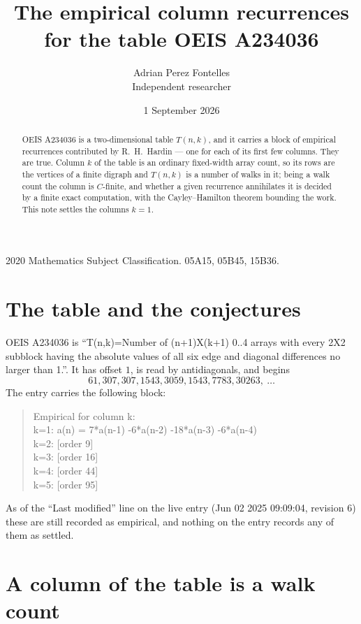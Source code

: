 \documentclass[11pt,a4paper]{article}
\title{The empirical column recurrences for the table OEIS A234036}
\author{Adrian Perez Fontelles\\ \small Independent researcher}
\date{1 September 2026}
\theoremstyle{plain}
\theoremstyle{definition}
\begin{document}
\maketitle

\begin{abstract}
OEIS A234036 is a two-dimensional table $T(n,k)$, and it carries a block of empirical
recurrences contributed by R.~H.~Hardin --- one for each of its first few columns. They are
true. Column $k$ of the table is an ordinary fixed-width array count, so its rows are the
vertices of a finite digraph and $T(n,k)$ is a number of walks in it; being a walk count the
column is $C$-finite, and whether a given recurrence annihilates it is decided by a finite
exact computation, with the Cayley--Hamilton theorem bounding the work. This note settles the
columns $k=1$.
\end{abstract}

\noindent\small 2020 Mathematics Subject Classification. 05A15, 05B45, 15B36.\normalsize

\section{The table and the conjectures}

OEIS A234036 is ``T(n,k)=Number of (n+1)X(k+1) 0..4 arrays with every 2X2 subblock having the absolute values of all six edge and diagonal differences no larger than 1.''. It has offset $1$, is
read by antidiagonals, and begins
\[
61, 307, 307, 1543, 3059, 1543, 7783, 30263,\ \dots
\]
The entry carries the following block:
\begin{quote}\small
Empirical for column k:\\
k=1: a(n) = 7*a(n-1) -6*a(n-2) -18*a(n-3) -6*a(n-4)\\
k=2: [order 9]\\
k=3: [order 16]\\
k=4: [order 44]\\
k=5: [order 95]\\
\end{quote}
As of the ``Last modified'' line on the live entry (Jun 02 2025 09:09:04, revision 6) these are still
recorded as empirical, and nothing on the entry records any of them as settled.

\section{A column of the table is a walk count}
\end{document}
